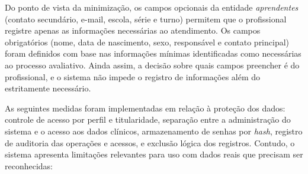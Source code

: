 Do ponto de vista da minimização, os campos opcionais da entidade \textit{aprendentes} (contato secundário, e-mail, escola, série e turno) permitem que o profissional registre apenas as informações necessárias ao atendimento. Os campos obrigatórios (nome, data de nascimento, sexo, responsável e contato principal) foram definidos com base nas informações mínimas identificadas como necessárias ao processo avaliativo. Ainda assim, a decisão sobre quais campos preencher é do profissional, e o sistema não impede o registro de informações além do estritamente necessário.

As seguintes medidas foram implementadas em relação à proteção dos dados: controle de acesso por perfil e titularidade, separação entre a administração do sistema e o acesso aos dados clínicos, armazenamento de senhas por \textit{hash}, registro de auditoria das operações e acessos, e exclusão lógica dos registros. Contudo, o sistema apresenta limitações relevantes para uso com dados reais que precisam ser reconhecidas:

